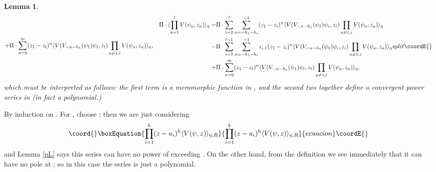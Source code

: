 \documentclass[a4paper,12pt]{article}
\providecommand{\IP}[1]{\langle#1\rangle}
\newtheorem{lem}[defn]{Lemma}
\providecommand{\oproof}[1]{\noindent {\bf Proof#1.\ }}
\begin{document}
\begin{lem}
\begin{equation}
{\begin{split}
+ & \Pi \cdot \sum_{n=0}^\infty (z_1 - z_l)^n \IP{V(V_{-n-h_1}(\psi_1) \psi_l, z_l) \prod_{a \ne 1,l} V(\psi_a, z_a)}_{\eta},
\end{split}
}{ \begin{split}
\Pi \cdot \IP{\prod_{a=1}^l V(\psi_a, z_a)}_{\eta}
= & \Pi \cdot \sum_{i=2}^{l} \sum_{n = - h_1 - h_i}^{-1} (z_1 - z_i)^{n} \IP{V(V_{-n-h_1}(\psi_1) \psi_i, z_i) \prod_{a \ne 1,i} V(\psi_a, z_a)}_{\eta} \\
- & \Pi \cdot \sum_{i=2}^{l-1} \sum_{n = - h_1 - h_i}^{-1} \iota_{i,1} (z_1 - z_i)^{n} \IP{V(V_{-n-h_1}(\psi_1) \psi_i, z_i) \prod_{a \ne 1,i} V(\psi_a, z_a)}_{\eta} \\
+ & \Pi \cdot \sum_{n=0}^\infty (z_1 - z_l)^n \IP{V(V_{-n-h_1}(\psi_1) \psi_l, z_l) \prod_{a \ne 1,l} V(\psi_a, z_a)}_{\eta},
\end{split}
}{split}\coordE{}\end{equation}
which must be interpreted as follows:  the first term is a meromorphic function in \coordHE{},
and the second two together define a convergent power series in \coordHE{} (in fact a polynomial.)
\end{lem}

\oproof{} By induction on \coordHE{}.  For \coordHE{}, choose \coordHE{}; then we are just considering
\begin{equation}\coord{}\boxEquation{
\prod_{i=1}^k (z - u_i)^{h} \IP{V(\psi, z)}_{\eta,R}
}{
\prod_{i=1}^k (z - u_i)^{h} \IP{V(\psi, z)}_{\eta,R}
}{ecuacion}\coordE{}\end{equation}
and Lemma \ref{pL} says this series can have no power of \coordHE{} exceeding \coordHE{}.  On the other hand,
from the definition we see immediately that it can have no pole at \coordHE{}; so in this case the series is just a polynomial. 
\end{document}
